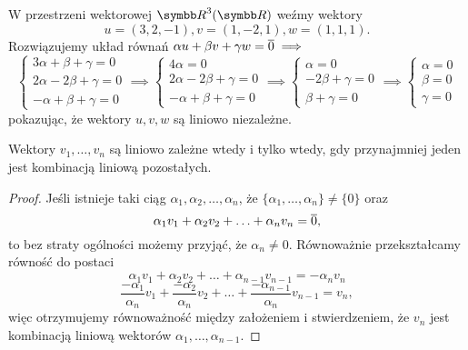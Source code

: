 \begin{example}
    W przestrzeni wektorowej $\RR^3(\RR)$ weźmy wektory
    \[ u = (3, 2, -1), v = (1, -2, 1), w = (1, 1, 1). \]
    Rozwiązujemy układ równań $\alpha u + \beta v + \gamma w = \overline{0} \implies$
    \begin{equation*}
        \begin{cases}
            3\alpha + \beta + \gamma = 0 \\
            2\alpha - 2\beta + \gamma = 0 \\
            -\alpha + \beta + \gamma = 0
        \end{cases} \implies
        \begin{cases}
            4\alpha = 0 \\
            2\alpha - 2\beta + \gamma = 0 \\
            -\alpha + \beta + \gamma = 0
        \end{cases} \implies
        \begin{cases}
            \alpha = 0 \\
            - 2\beta + \gamma = 0 \\
            \beta + \gamma = 0
        \end{cases} \implies
        \begin{cases}
            \alpha = 0 \\
            \beta = 0 \\
            \gamma = 0
        \end{cases}
    \end{equation*}
    pokazując, że wektory $u, v, w$ są liniowo niezależne.
\end{example}

\begin{theorem}
    \label{t:linear independence}
    Wektory $v_1, \ldots, v_n$ są liniowo zależne wtedy i tylko wtedy, gdy przynajmniej jeden jest kombinacją liniową pozostałych.
\end{theorem}
\begin{proof}
    Jeśli istnieje taki ciąg $\alpha_1, \alpha_2, \ldots, \alpha_n$, że $\{\alpha_1, \ldots, \alpha_n\} \neq \{0\}$ oraz
    \[ \alpha_1v_1 + \alpha_2v_2 + \ldots + \alpha_nv_n = \overline{0}, \]
    to bez straty ogólności możemy przyjąć, że $\alpha_n \neq 0$. Równoważnie przekształcamy równość do postaci
    \[ \alpha_1v_1 + \alpha_2v_2 + \ldots + \alpha_{n-1}v_{n-1} = -\alpha_nv_n \]
    \[ \frac{-\alpha_1}{\alpha_n}v_1 + \frac{-\alpha_2}{\alpha_n}v_2 + \ldots + \frac{-\alpha_{n-1}}{\alpha_n}v_{n-1} = v_n, \]
    więc otrzymujemy równoważność między założeniem i stwierdzeniem, że $v_n$ jest kombinacją liniową wektorów $\alpha_1, \ldots, \alpha_{n-1}$.
\end{proof}

